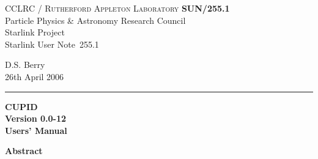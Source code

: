 \documentclass[twoside,11pt]{article}
\newcommand{\stardoccategory}  {Starlink User Note}
\newcommand{\stardocinitials}  {SUN}
\newcommand{\stardocnumber}    {255.1}
\newcommand{\stardocauthors}   {D.S. Berry}
\newcommand{\stardocdate}      {26th April 2006}
\newcommand{\stardoctitle}     {CUPID}
\newcommand{\stardocversion}   {Version 0.0-12}
\newcommand{\stardocmanual}    {Users' Manual}
\newcommand{\stardocname}{\stardocinitials /\stardocnumber}
\newenvironment{latexonly}{}{}
\renewcommand{\_}{\texttt{\symbol{95}}}
\begin{document}
\thispagestyle{empty}

\begin{latexonly}
   CCLRC / \textsc{Rutherford Appleton Laboratory} \hfill \textbf{\stardocname}\\
   {\large Particle Physics \& Astronomy Research Council}\\
   {\large Starlink Project\\}
   {\large \stardoccategory\ \stardocnumber}
   \begin{flushright}
   \stardocauthors\\
   \stardocdate
   \end{flushright}
   \vspace{-4mm}
   \rule{\textwidth}{0.5mm}
   \vspace{5mm}
   \begin{center}
   {\Huge\textbf{\stardoctitle \\ [2.5ex]}}
   {\LARGE\textbf{\stardocversion \\ [4ex]}}
   {\Huge\textbf{\stardocmanual}}
   \end{center}
   \vspace{5mm}


   \vspace{5mm}
   \begin{center}
      {\Large\textbf{Abstract}}
   \end{center}
\end{latexonly}
\end{document}
